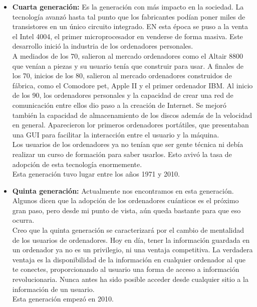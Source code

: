 \documentclass[titlepage, 12pt, a4paper]{article}
\begin{document}
\begin{itemize}
	\item{\textbf{Cuarta generación: }}Es la generación con más impacto en la sociedad. La tecnología avanzó hasta tal punto que los fabricantes podían poner miles de transistores en un único circuito integrado. EN esta época se puso a la venta el Intel 4004, el primer microprocesador en venderse de forma masiva. Este desarrollo inició la industria de los ordenadores personales.\\A mediados de los 70, salieron al mercado ordenadores como el Altair 8800 que venían a piezas y su usuario tenía que construir para usar. A finales de los 70, inicios de los 80, salieron al mercado ordenadores construidos de fábrica, como el Comodore pet, Apple II y el primer ordenador IBM. Al inicio de los 90, los ordenadores personales y la capacidad de crear una red de comunicación entre ellos dio paso a la creación de Internet. Se mejoró también la capacidad de almacenamiento de los discos además de la velocidad en general. Aparecieron lor primeros ordenadores portátiles, que presentaban una \Gls{GUI} para facilitar la interacción entre el usuario y la máquina.\\Los usuarios de los ordenadores ya no tenían que ser gente técnica ni debía realizar un curso de formación para saber usarlos. Esto avivó la tasa de adopción de esta tecnología enormemente.\\Esta generación tuvo lugar entre los años 1971 y 2010.
	\item{\textbf{Quinta generación: }}Actualmente nos encontramos en esta generación. Algunos dicen que la adopción de los ordenadores cuánticos es el próximo gran paso, pero desde mi punto de vista, aún queda bastante para que eso ocurra.\\Creo que la quinta generación se caracterizará por el cambio de mentalidad de los usuarios de ordenadores. Hoy en día, tener la información guardada en un ordenador ya no es un privilegio, ni una ventaja competitiva. La verdadera ventaja es la disponibilidad de la información en cualquier ordenador al que te conectes, proporcionando al usuario una forma de acceso a información revolucionaria. Nunca antes ha sido posible acceder desde cualquier sitio a la información de un usuario.\\Esta generación empezó en 2010.
\end{itemize}
\end{document}
